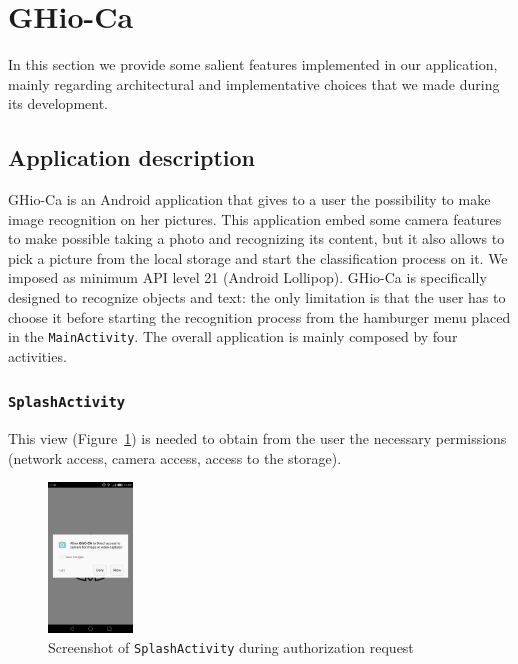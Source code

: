 \section{GHio-Ca}
\label{sec:ghioca}
In this section we provide some salient features implemented in our
application, mainly regarding architectural and implementative choices that
we made during its development.

\subsection{Application description}
GHio-Ca is an Android application that gives to a user the possibility to make
image recognition on her pictures. This application embed some camera features
to make possible taking a photo and recognizing its content, but it also allows
to pick a picture from the local storage and start the classification process
on it. We imposed as minimum API level 21 (Android Lollipop).
GHio-Ca is specifically designed to recognize objects and text: the only
limitation is that the user has to choose it before starting the recognition
process from the hamburger menu placed in the \texttt{MainActivity}.
The overall application is mainly composed by four activities.

\subsubsection{\texttt{SplashActivity}}
This view (Figure~\ref{fig:splash}) is needed to obtain from the user
the necessary permissions (network access, camera access, access to  the
storage).
\begin{figure}[h]
    \centering
    \includegraphics[width=0.2\textwidth]{../img/splash}
    \caption{Screenshot of \texttt{SplashActivity} during authorization request}
    \label{fig:splash}
\end{figure}

